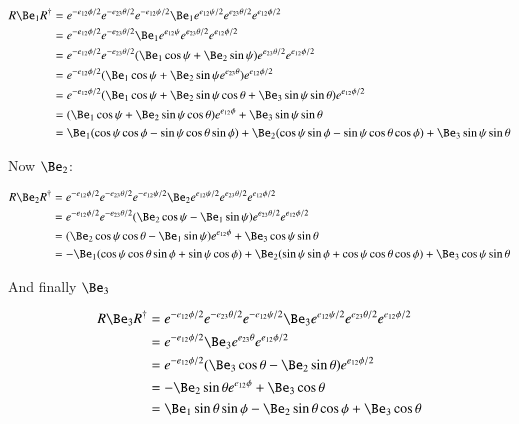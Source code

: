 \documentclass{article}
\begin{document}
\begin{align*}
R \Be_1 R^\dagger
&= 
e^{-e_{12}\phi/2} e^{-e_{23}\theta/2} e^{-e_{12}\psi/2}
\Be_1
e^{e_{12}\psi/2}
e^{e_{23}\theta/2} 
e^{e_{12}\phi/2} \\
&= 
e^{-e_{12}\phi/2} e^{-e_{23}\theta/2} 
\Be_1 e^{e_{12}\psi}
e^{e_{23}\theta/2} 
e^{e_{12}\phi/2} \\
&= 
e^{-e_{12}\phi/2} e^{-e_{23}\theta/2} 
(\Be_1 \cos\psi + \Be_2 \sin\psi)
e^{e_{23}\theta/2} 
e^{e_{12}\phi/2} \\
&= 
e^{-e_{12}\phi/2} 
(\Be_1 \cos\psi + \Be_2 \sin\psi e^{e_{23}\theta} )
e^{e_{12}\phi/2} \\
&= 
e^{-e_{12}\phi/2} 
(\Be_1 \cos\psi + \Be_2 \sin\psi \cos\theta + \Be_3 \sin\psi \sin\theta )
e^{e_{12}\phi/2} \\
&= 
(\Be_1 \cos\psi + \Be_2 \sin\psi \cos\theta ) e^{e_{12}\phi} 
+ \Be_3 \sin\psi \sin\theta  \\
&= 
  \Be_1 (\cos\psi \cos\phi - \sin\psi \cos\theta \sin\phi)
+ \Be_2 (\cos\psi \sin\phi - \sin\psi \cos\theta \cos\phi)
+ \Be_3 \sin\psi \sin\theta  \\
\end{align*}

Now $\Be_2$:

\begin{align*}
R \Be_2 R^\dagger
&= 
e^{-e_{12}\phi/2} e^{-e_{23}\theta/2} e^{-e_{12}\psi/2}
\Be_2
e^{e_{12}\psi/2}
e^{e_{23}\theta/2} 
e^{e_{12}\phi/2} \\
&= 
e^{-e_{12}\phi/2} e^{-e_{23}\theta/2} 
(\Be_2 \cos\psi - \Be_1 \sin\psi)
e^{e_{23}\theta/2} 
e^{e_{12}\phi/2} \\
&= 
(\Be_2 \cos\psi \cos\theta
- \Be_1 \sin\psi)
e^{e_{12}\phi} 
+\Be_3 \cos\psi \sin\theta \\
&= 
- \Be_1 (\cos\psi \cos\theta \sin\phi + \sin\psi \cos\phi)
+ \Be_2 (\sin\psi \sin\phi + \cos\psi \cos\theta \cos\phi)
+ \Be_3 \cos\psi \sin\theta \\
\end{align*}

And finally $\Be_3$

\begin{align*}
R \Be_3 R^\dagger
&= 
e^{-e_{12}\phi/2} e^{-e_{23}\theta/2} e^{-e_{12}\psi/2}
\Be_3
e^{e_{12}\psi/2}
e^{e_{23}\theta/2} 
e^{e_{12}\phi/2} \\
&= 
e^{-e_{12}\phi/2} 
\Be_3 e^{e_{23}\theta} 
e^{e_{12}\phi/2} \\
&= 
e^{-e_{12}\phi/2} 
(
\Be_3 \cos\theta
-\Be_2 \sin\theta
)
e^{e_{12}\phi/2} \\
&= -\Be_2 \sin\theta e^{e_{12}\phi} +\Be_3 \cos\theta \\
&= 
 \Be_1 \sin\theta \sin\phi
-\Be_2 \sin\theta \cos\phi
+\Be_3 \cos\theta \\
\end{align*}
\end{document}
